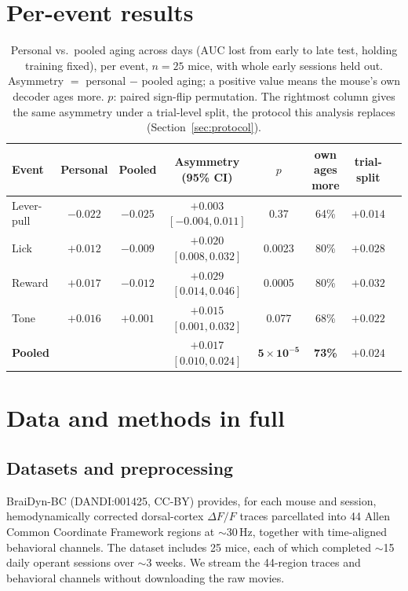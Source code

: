 \documentclass{article}
\newcommand{\auc}{\mathrm{AUC}}
\begin{document}
\section{Per-event results}
\label{app:perevent}
\begin{table}[t]\centering
\caption{Personal vs.\ pooled aging across days ($\auc$ lost from early to late test, holding
training fixed), per event, $n = 25$ mice, with whole early sessions held out. Asymmetry $=$
personal $-$ pooled aging; a positive value means the mouse's own decoder ages more. $p$: paired
sign-flip permutation. The rightmost column gives the same asymmetry under a trial-level split, the
protocol this analysis replaces (Section~\ref{sec:protocol}).}
\label{tab:asym}
\setlength{\tabcolsep}{4pt}
\begin{tabular}{lccccccc}
\toprule
Event & Personal & Pooled & Asymmetry (95\% CI) & $p$ & own ages more & trial-split \\
\midrule
Lever-pull & $-0.022$ & $-0.025$ & $+0.003$ $[-0.004, 0.011]$ & 0.37 & 64\% & $+0.014$ \\
Lick       & $+0.012$ & $-0.009$ & $+0.020$ $[0.008, 0.032]$ & 0.0023 & 80\% & $+0.028$ \\
Reward     & $+0.017$ & $-0.012$ & $+0.029$ $[0.014, 0.046]$ & 0.0005 & 80\% & $+0.032$ \\
Tone       & $+0.016$ & $+0.001$ & $+0.015$ $[0.001, 0.032]$ & 0.077 & 68\% & $+0.022$ \\
\midrule
\textbf{Pooled} & & & $\mathbf{+0.017}$ $[0.010, 0.024]$ & $\mathbf{5\times10^{-5}}$ & \textbf{73\%} & $+0.024$ \\
\bottomrule
\end{tabular}
\end{table}

\section{Data and methods in full}
\label{app:methods}
\subsection{Datasets and preprocessing}
BraiDyn-BC \citep{kondo2025} (DANDI:001425, CC-BY) provides, for each mouse and
session, hemodynamically corrected dorsal-cortex $\Delta F/F$ traces parcellated into 44 Allen Common
Coordinate Framework regions at $\sim$30\,Hz, together with time-aligned behavioral channels. The
dataset includes 25 mice, each of which completed $\sim$15 daily operant sessions over $\sim$3 weeks.
We stream the 44-region traces and behavioral channels without downloading the raw movies.
\end{document}
